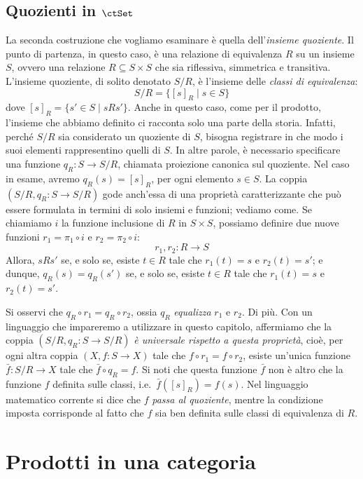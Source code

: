 \subsection*{Quozienti in \(\ctSet\)}\label{quoz_in_set}
La seconda costruzione che vogliamo esaminare è quella dell'\emph{insieme quoziente}. Il punto di partenza, in questo caso, è una relazione di equivalenza \(R\) su un insieme \(S\), ovvero una relazione \(R\subseteq S\times S\) che sia riflessiva, simmetrica e transitiva. L'insieme quoziente, di solito denotato \(S/R\), è l'insieme delle \emph{classi di equivalenza}:
\[
S/R=\{[s]_R\mid s\in S\}
\]
dove \([s]_R=\{s'\in S\mid sRs'\}\). Anche in questo caso, come per il prodotto, l'insieme che abbiamo definito ci racconta solo una parte della storia. Infatti, perché \(S/R\) sia considerato un quoziente di \(S\), bisogna registrare in che modo i suoi elementi rappresentino quelli di \(S\). In altre parole, è necessario specificare una funzione \(q_R\colon S\to S/R\),  chiamata proiezione canonica sul quoziente. Nel caso in esame, avremo \(q_R(s)=[s]_R\), per ogni elemento \(s\in S\). La coppia \((S/R, q_R\colon S\to S/R)\) gode anch'essa di una proprietà caratterizzante che può essere formulata in termini di solo insiemi e funzioni; vediamo come.  Se chiamiamo $i$ la funzione inclusione di \(R\) in \(S\times  S\), possiamo definire due nuove funzioni \(r_1=\pi_1\circ i\) e \(r_2=\pi_2\circ i\):
\[
r_1, r_2\colon R\to S
\] 
Allora, \(s R s'\) se, e solo se, esiste \(t\in R\) tale che \(r_1(t)=s\) e \(r_2(t)=s'\); e dunque, \(q_R(s)=q_R(s')\) se, e solo se, esiste \(t\in R\) tale che \(r_1(t)=s\) e \(r_2(t)=s'\). 

Si osservi che \(q_R\circ r_1=q_R\circ r_2 \), ossia \(q_R\) \emph{equalizza} \(r_1\) e \(r_2\). Di più. Con un linguaggio che impareremo a utilizzare in questo capitolo, affermiamo che la coppia \((S/R,q_R\colon S\to S/R)\) \emph{è universale rispetto a questa proprietà}, cioè, per ogni altra coppia \((X,f\colon S\to X)\) tale che  \(f\circ r_1=f\circ r_2 \), esiste un'unica funzione \(\bar f\colon S/R\to X\) tale che \(\bar f\circ q_R= f\). Si noti che questa funzione \(\bar f\) non è altro che la funzione \(f\) definita sulle classi, i.e.\ \(\bar f([s]_R)= f(s)\). Nel linguaggio matematico corrente si dice che \(f\) \emph{passa al quoziente}, mentre la condizione imposta corrisponde al fatto che \(f\) sia ben definita sulle classi di equivalenza di \(R\).


\section{Prodotti  in una categoria}

